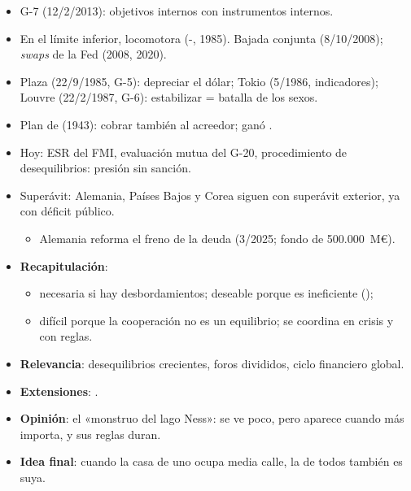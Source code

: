 \documentclass{article}
\begin{document}
\begin{columnas}
\begin{itemize}
\item G-7 (12/2/2013): objetivos internos con instrumentos internos.
\item En el límite inferior, locomotora (-, 1985). Bajada conjunta (8/10/2008); \emph{swaps} de la Fed (2008, 2020).
\end{itemize}
\begin{itemize}
\item Plaza (22/9/1985, G-5): depreciar el dólar; Tokio (5/1986, indicadores); Louvre (22/2/1987, G-6): estabilizar = batalla de los sexos.
\end{itemize}
\begin{itemize}
\item Plan de  (1943): cobrar también al acreedor; ganó  .
\item Hoy: ESR del FMI, evaluación mutua del G-20, procedimiento de desequilibrios: presión sin sanción.
\item Superávit: Alemania, Países Bajos y Corea siguen con superávit exterior, ya con déficit público.
  \begin{itemize}
  \item Alemania reforma el freno de la deuda (3/2025; fondo de 500.000~M€).
  \end{itemize}
\end{itemize}

\begin{itemize}
\item \textbf{Recapitulación}:
  \begin{itemize}
  \item necesaria si hay desbordamientos; deseable porque  es ineficiente ();
  \item difícil porque la cooperación no es un equilibrio; se coordina en crisis y con reglas.
  \end{itemize}
\item \textbf{Relevancia}: desequilibrios crecientes, foros divididos, ciclo financiero global.
\item \textbf{Extensiones}:       .
\item \textbf{Opinión}: el «monstruo del lago Ness»: se ve poco, pero aparece cuando más importa, y sus reglas duran.
\item \textbf{Idea final}: cuando la casa de uno ocupa media calle, la de todos también es suya.
\end{itemize}


\end{columnas}
\end{document}
